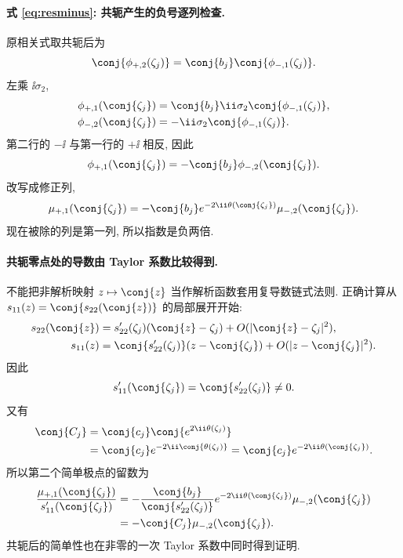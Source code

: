 \paragraph{式 \eqref{eq:resminus}: 共轭产生的负号逐列检查.}
原相关式取共轭后为
\[
\conj{\phi_{+,2}(\zeta_j)}
=\conj{b_j}\conj{\phi_{-,1}(\zeta_j)}.
\]
左乘 $\ii\sigma_2$,
\begin{align*}
\phi_{+,1}(\conj{\zeta_j})
&=\conj{b_j}\ii\sigma_2\conj{\phi_{-,1}(\zeta_j)},\\
\phi_{-,2}(\conj{\zeta_j})
&=-\ii\sigma_2\conj{\phi_{-,1}(\zeta_j)}.
\end{align*}
第二行的 $-\ii$ 与第一行的 $+\ii$ 相反,
因此
\[
\phi_{+,1}(\conj{\zeta_j})
=-\conj{b_j}\phi_{-,2}(\conj{\zeta_j}).
\]
改写成修正列,
\[
\mu_{+,1}(\conj{\zeta_j})
=-\conj{b_j}e^{-2\ii\theta(\conj{\zeta_j})}
\mu_{-,2}(\conj{\zeta_j}).
\]
现在被除的列是第一列, 所以指数是负两倍.

\paragraph{共轭零点处的导数由 Taylor 系数比较得到.}
不能把非解析映射 $z\mapsto\conj{z}$ 当作解析函数套用复导数链式法则.
正确计算从
$s_{11}(z)=\conj{s_{22}(\conj{z})}$ 的局部展开开始:
\begin{align*}
s_{22}(\conj{z})
&=s_{22}'(\zeta_j)(\conj{z}-\zeta_j)
+O(|\conj{z}-\zeta_j|^2),\\
s_{11}(z)
&=\conj{s_{22}'(\zeta_j)}(z-\conj{\zeta_j})
+O(|z-\conj{\zeta_j}|^2).
\end{align*}
因此
\[
s_{11}'(\conj{\zeta_j})=\conj{s_{22}'(\zeta_j)}\ne0.
\]
又有
\begin{align*}
\conj{C_j}
&=\conj{c_j}\conj{e^{2\ii\theta(\zeta_j)}}\\
&=\conj{c_j}e^{-2\ii\conj{\theta(\zeta_j)}}
=\conj{c_j}e^{-2\ii\theta(\conj{\zeta_j})}.
\end{align*}
所以第二个简单极点的留数为
\begin{align*}
\dfrac{\mu_{+,1}(\conj{\zeta_j})}{s_{11}'(\conj{\zeta_j})}
&=-\dfrac{\conj{b_j}}{\conj{s_{22}'(\zeta_j)}}
 e^{-2\ii\theta(\conj{\zeta_j})}\mu_{-,2}(\conj{\zeta_j})\\
&=-\conj{C_j}\mu_{-,2}(\conj{\zeta_j}).
\end{align*}
共轭后的简单性也在非零的一次 Taylor 系数中同时得到证明.


